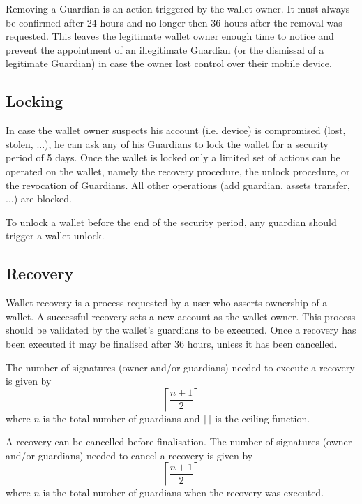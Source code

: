 \documentclass[12pt]{article}
\begin{document}
Removing a Guardian is an action triggered by the wallet owner. It must always be confirmed after 24 hours and no longer then 36 hours after the removal was requested. This leaves the legitimate wallet owner enough time to notice and prevent the appointment of an illegitimate Guardian (or the dismissal of a legitimate Guardian) in case the owner lost control over their mobile device.

\subsection{Locking}

In case the wallet owner suspects his account (i.e. device) is compromised (lost, stolen, ...), he can ask any of his Guardians to lock the wallet for a security period of 5 days. Once the wallet is locked only a limited set of actions can be operated on the wallet, namely the recovery procedure, the unlock procedure, or the revocation of Guardians. All other operations (add guardian, assets transfer, ...) are blocked.

To unlock a wallet before the end of the security period, any guardian should trigger a wallet unlock.

\subsection{Recovery}

Wallet recovery is a process requested by a user who asserts ownership of a wallet. A successful recovery sets a new account as the wallet owner. This process should be validated by the wallet's guardians to be executed. Once a recovery has been executed it may be finalised after 36 hours, unless it has been cancelled.

The number of signatures (owner and/or guardians) needed to execute a recovery is given by
\begin{equation*}
    \left\lceil {\frac{n+1}{2}} \right\rceil
\end{equation*}
where $n$ is the total number of guardians and $\lceil\rceil$ is the ceiling function.

A recovery can be cancelled before finalisation. The number of signatures (owner and/or guardians) needed to cancel a recovery is given by
\begin{equation*}
    \left\lceil {\frac{n+1}{2}} \right\rceil
\end{equation*}
where $n$ is the total number of guardians when the recovery was executed.
\end{document}
